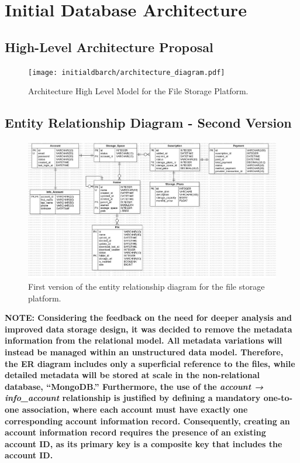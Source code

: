 \section{Initial Database Architecture}
\subsection{High-Level Architecture Proposal}

\begin{figure}[H]
    \centering
    \texttt{[image: initialdbarch/architecture\_diagram.pdf]}
    \caption{Architecture High Level Model for the File Storage Platform.}
    \label{fig:architecture_diagram}
\end{figure}

\subsection{Entity Relationship Diagram - Second Version}
\begin{figure}[H]
    \centering
    \includegraphics[width=\linewidth,height=0.95\textheight,keepaspectratio]{initialdbarch/ER.cloud.jpg}
    \caption{ First version of the entity relationship diagram for the file storage platform.}
    \label{fig:Entity Relaction}
\end{figure}
\textbf{NOTE: Considering the feedback on the need for deeper analysis and improved data storage design, it was decided to remove the metadata information from the relational model. All metadata variations will instead be managed within an unstructured data model. Therefore, the ER diagram includes only a superficial reference to the files, while detailed metadata will be stored at scale in the non-relational database, “MongoDB.” Furthermore, the use of the \textit{account → info\_account} relationship is justified by defining a mandatory one-to-one association, where each account must have exactly one corresponding account information record. Consequently, creating an account information record requires the presence of an existing account ID, as its primary key is a composite key that includes the account ID.}

